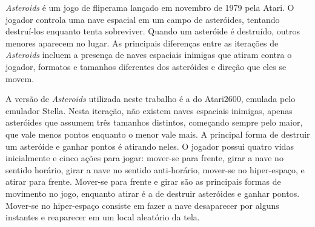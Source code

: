 \textit{Asteroids} é um jogo de fliperama
 lançado em novembro de 1979 pela
 Atari.
O jogador controla uma nave espacial em um campo de asteróides, tentando destruí-los enquanto tenta sobreviver.
Quando um asteróide é destruído, outros menores aparecem no lugar.
As principais diferenças entre as iterações de \textit{Asteroids} incluem a presença de naves espaciais inimigas que atiram contra o jogador, formatos e tamanhos diferentes dos asteróides e direção que eles se movem.

A versão de \textit{Asteroids} utilizada neste trabalho é a do Atari2600, emulada pelo emulador Stella.
Nesta iteração, não existem naves espaciais inimigas, apenas asteróides que assumem três tamanhos distintos, começando sempre pelo maior, que vale menos pontos enquanto o menor vale mais.
A principal forma de destruir um asteróide e ganhar pontos é atirando neles.
O jogador possui quatro vidas inicialmente e cinco ações para jogar: mover-se para frente, girar a nave no sentido horário, girar a nave no sentido anti-horário, mover-se no hiper-espaço, e atirar para frente.
Mover-se para frente e girar são as principais formas de movimento no jogo, enquanto atirar é a de destruir asteróides e ganhar pontos.
Mover-se no hiper-espaço consiste em fazer a nave desaparecer por alguns instantes e reaparecer em um local aleatório da tela.

